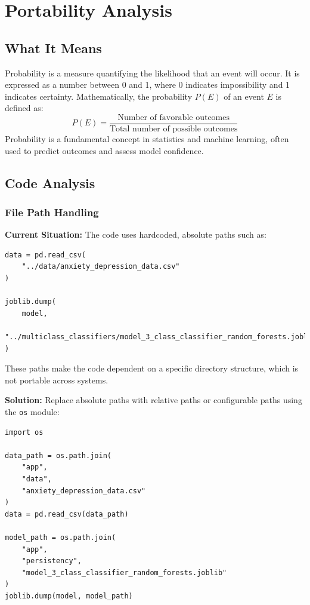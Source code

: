 \documentclass[runningheads,a4paper,11pt]{report}
\begin{document}
\section{Portability Analysis}
\label{section:portability-analysis}

\subsection{What It Means}
Probability is a measure quantifying the likelihood that an event will occur. It is expressed as a number between 0 and 1, where 0 indicates impossibility and 1 indicates certainty. Mathematically, the probability \( P(E) \) of an event \( E \) is defined as:
\[
P(E) = \frac{\text{Number of favorable outcomes}}{\text{Total number of possible outcomes}}
\]
Probability is a fundamental concept in statistics and machine learning, often used to predict outcomes and assess model confidence.

\subsection{Code Analysis}
\label{section:code_analysis}

\subsubsection{File Path Handling}
\label{section:file-path-handaling}
\textbf{Current Situation:} The code uses hardcoded, absolute paths such as:
\begin{verbatim}
data = pd.read_csv(
    "../data/anxiety_depression_data.csv"
)

joblib.dump(
    model, 
    "../multiclass_classifiers/model_3_class_classifier_random_forests.joblib"
)
\end{verbatim}
These paths make the code dependent on a specific directory structure, which is not portable across systems.

\textbf{Solution:} Replace absolute paths with relative paths or configurable paths using the \texttt{os} module:
\begin{verbatim}
import os

data_path = os.path.join(
    "app", 
    "data", 
    "anxiety_depression_data.csv"
)
data = pd.read_csv(data_path)

model_path = os.path.join(
    "app", 
    "persistency", 
    "model_3_class_classifier_random_forests.joblib"
)
joblib.dump(model, model_path)
\end{verbatim}
\end{document}
